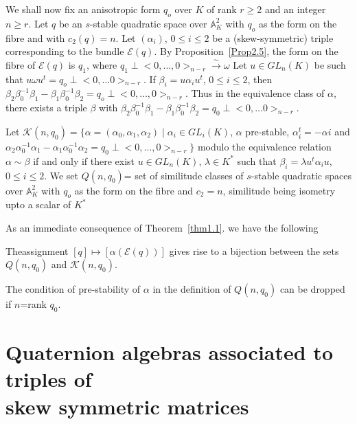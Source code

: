 \begin{Proof}
We shall now fix an anisotropic form $q_o$ over $K$ of rank $r\geq 2$ and an integer $n\geq r$. Let $q$ be an $s$-stable quadratic space over $\mathbb{A}^{2}_K$ with $q_o$ as the form on the fibre and with $c_2(q)=n$. Let $(\alpha_i)$, $0\leq i\leq 2$ be a (skew-symmetric) triple corresponding to the bundle $\mathscr{E}(q)$. By Proposition~\ref{Prop2.5}, the form on the fibre of $\mathscr{E}(q)$ is $q_1$, where $q_1\perp <0,\ldots,0>_{n-r}\xrightarrow{\sim}\omega$ Let $u\in GL_n(K)$ be such that $u\omega u^{t}=q_o\perp <0,\ldots0>_{n-r}$. If $\beta_i=u\alpha_iu^{t}$, $0\leq i\leq 2$, then $\beta_2\beta^{-1}_0\beta_1-\beta_1\beta_0^{-1}\beta_2=q_o\perp <0,\ldots,0>_{n-r}$. Thus in the equivalence class of $\alpha$, there exists a triple $\beta$ with $\beta_2\beta^{-1}_0\beta_1-\beta_1\beta^{-1}_0\beta_2=q_0\perp <0,\ldots 0>_{n-r}$. 

Let $\mathscr{K}(n,q_0)=\{\alpha=(\alpha_0,\alpha_1,\alpha_2)\mid \alpha_i\in GL_i(K)$, $\alpha$ pre-stable, $\alpha^{t}_i=-\alpha i$ and $\alpha_2 \alpha_0^{-1}\alpha_1-\alpha_1\alpha^{-1}_0\alpha_2=q_0\perp <0,\ldots,0>_{n-r}\}$ modulo the equivalence relation $\alpha\sim \beta$ if and only if there exist $u\in GL_n(K)$, $\lambda \in K^{\ast}$ such that $\beta_i=\lambda u^{t}\alpha_i u$, $0\leq i\leq 2$. We set $Q(n, q_0)$= set of similitude classes of $s$-stable quadratic spaces over $\mathbb{A}^{2}_K$ with $q_o$ as the form on the fibre and $c_2=n$, similitude being isometry upto a scalar of $K^{\ast}$ 

As an immediate consequence of Theorem~\ref{thm1.1}. we have the following 
\end{Proof}

\begin{thm}\label{thm2.6}
The\pageoriginale assignment $[q]\mapsto [\alpha(\mathscr{E}(q))]$ gives rise to a bijection between the sets $Q(n,q_0)$ and $\mathscr{K}(n,q_0)$. 
\end{thm}

\begin{remark}
The condition of pre-stability of $\alpha$ in the definition of $Q(n,q_0)$ can be dropped if $n$=rank $q_0$. 
\end{remark}

\section[Quaternion algebras associated to triples...]{Quaternion algebras associated to triples of\\ skew symmetric matrices}\label{s3}

